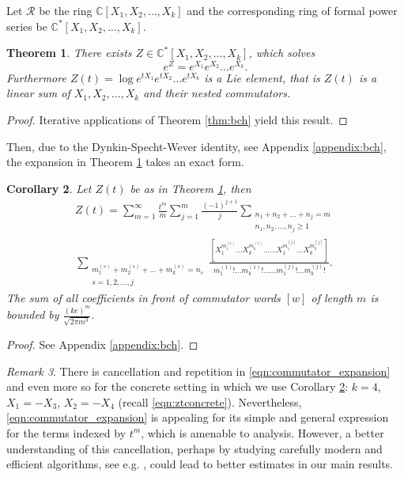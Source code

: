 \documentclass[11pt]{amsart}
\theoremstyle{plain}
\newtheorem{theorem}{Theorem}[section]
\newtheorem{corollary}[theorem]{Corollary}
\theoremstyle{remark}
\newtheorem{remark}[theorem]{Remark}
\numberwithin{equation}{section}
\begin{document}
Let $\mathcal{R}$ be the ring
$\mathbb{C}[X_1, X_2,\ldots, X_k]$ and the corresponding ring of formal power series be $\mathbb{C}^*[X_1, X_2,\ldots, X_k]$.

\begin{theorem}\label{thm:k-commutators}
There exists $Z\in\mathbb{C}^*[X_1,X_2,\ldots, X_k]$, which solves 
$$e^Z=e^{X_1}e^{X_2}\ldots e^{X_k}.$$
Furthermore $Z(t)= \log e^{tX_1}e^{tX_2}\ldots e^{tX_k}$ is a Lie element, that is $Z(t)$ is a linear sum of $X_1, X_2, \ldots, X_k$ and their nested commutators. 
\end{theorem}
\begin{proof}
Iterative applications of Theorem \ref{thm:bch} yield this result.
\end{proof}

Then, due to the Dynkin-Specht-Wever identity, see Appendix \ref{appendix:bch}, the expansion in Theorem \ref{thm:k-commutators} takes an exact form.

\begin{corollary}\label{cor:k-commutators}
Let $Z(t)$ be as in Theorem \ref{thm:k-commutators}, then
\begin{multline}\label{eqn:commutator_expansion}
Z(t)
=\sum_{m=1}^{\infty}\frac{t^m}{m} 
%
\sum_{j=1}^{m}\frac{(-1)^{j+1}}{j}
%
\sum_{
\substack{
n_1+n_2+\ldots +n_j=m
\\n_1,n_2,\ldots,n_j\geq 1
}}
\\ 
\sum_{
\substack{
m_1^{(s)}+m_2^{(s)}+\ldots +m_k^{(s)}=n_s
\\
s=1,2,\ldots, j 
}
}
%
\frac
{[X_1^{m_1^{(1)}}\ldots X_k^{m_k^{(1)}}\ldots \ldots X_1^{m_1^{(j)}}\ldots X_k^{m_k^{(j)}}]}
{m_1^{(1)}! \ldots m_k^{(1)}!\ldots\ldots m_1^{(j)}! \ldots m_k^{(j)}!}.
\end{multline}
The sum of all coefficients in front of commutator words $[w]$ of length $m$ is bounded by $\frac{(ke)^m}{\sqrt{2\pi m^3}}$.
\end{corollary}

\begin{proof}
See Appendix \ref{appendix:bch}. 
\end{proof}

\begin{remark}
There is cancellation and repetition in \eqref{eqn:commutator_expansion} and even more so for the concrete setting in which we use Corollary \ref{cor:k-commutators}: $k=4$, $X_1=-X_3$, $X_2=-X_4$ (recall \eqref{eqn:ztconcrete}). Nevertheless, \eqref{eqn:commutator_expansion} is appealing for its simple and general expression for the terms indexed by $t^m$, which is amenable to analysis.
However, a better understanding of this cancellation, perhaps by studying carefully modern and efficient algorithms, see e.g.
\cite{VanVis}, could lead to better estimates in our main results. 
\end{remark}
%
%
\end{document}
